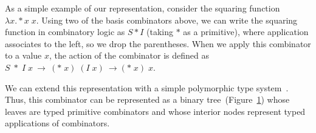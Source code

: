 \documentclass{article}
\begin{document}
As a simple example of our representation, consider the squaring
function $\lambda x. * x\; x $. Using two of the basis combinators
above, we can write the squaring function in combinatory logic as $S *
I$ (taking $*$ as a primitive), where application associates to the
left, so we drop the parentheses. When we apply this combinator to a
value $x$, the action of the combinator is defined as $S \;*\; I\;
x~\rightarrow~(*\; x)\; (I\; x)~\rightarrow(*\; x)\; x$.

We can extend this representation with a simple polymorphic type
system~\cite{Pierce_2002}. Thus, this combinator can be represented as
a binary tree~(Figure~\ref{fig:clbintree}) whose leaves are typed
primitive combinators and whose interior nodes represent typed applications
of combinators.

\begin{figure}
  \centering
  \begin{subfigure}[Before]{0.5\linewidth}
    \label{fig:clbintree}
  \end{subfigure}
  \begin{subfigure}[After]{0.4\linewidth}
\end{subfigure}
\end{figure}
\end{document}
